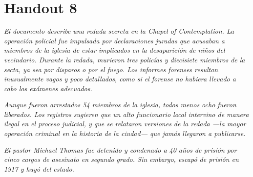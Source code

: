 \chapter{Handout 8}

\emph{El documento describe una redada secreta en la \emph{Chapel of
Contemplation}. La operación policial fue impulsada por declaraciones juradas
que acusaban a miembros de la iglesia de estar implicados en la desaparición de
niños del vecindario. Durante la redada, murieron tres policías y diecisiete
miembros de la secta, ya sea por disparos o por el fuego. Los informes forenses
resultan inusualmente vagos y poco detallados, como si el forense no hubiera
llevado a cabo los exámenes adecuados.}

\emph{Aunque fueron arrestados 54 miembros de la iglesia, todos menos ocho
fueron liberados. Los registros sugieren que un alto funcionario local
intervino de manera ilegal en el proceso judicial, y que se relataron versiones
de la redada —la mayor operación criminal en la historia de la ciudad— que
jamás llegaron a publicarse.}

\emph{El pastor Michael Thomas fue detenido y condenado a 40 años de prisión
por cinco cargos de asesinato en segundo grado. Sin embargo, escapó de prisión
en 1917 y huyó del estado.}


